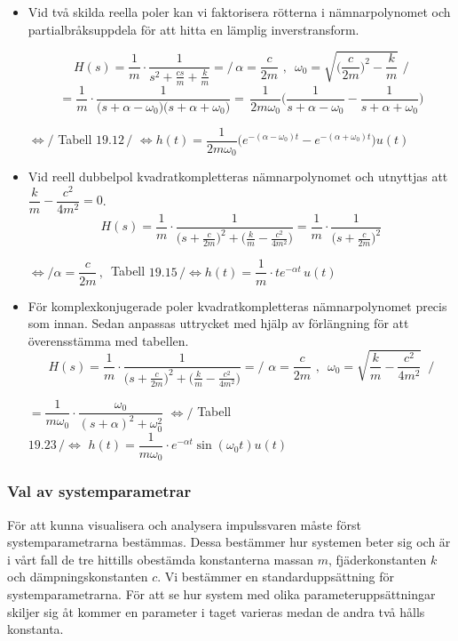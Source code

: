 \begin{itemize}
    \item Vid två skilda reella poler kan vi faktorisera rötterna i nämnarpolynomet och partialbråksuppdela för att hitta en lämplig inverstransform.
    
    $$H(s)=\frac{1}{m} \cdot \frac{1}{s^2+\frac{cs}{m}+\frac{k}{m}}=\Bigg/ \,\alpha=\frac{c}{2m}\,\,,\,\,\, \omega_0=\sqrt{\bigg(\frac{c}{2m}\bigg)^2-\frac{k}{m}} \,\,\Bigg/$$
    $$=\frac{1}{m} \cdot \frac{1}{\big(s+\alpha-\omega_0\big)\big(s+\alpha+\omega_0\big)}  = \, \frac{1}{2m\omega_0} \Bigg(\frac{1}{s+\alpha-\omega_0}-\frac{1}{s+\alpha+\omega_0}\Bigg)$$
    \begin{center}$ \Longleftrightarrow \bigg/$ Tabell $19.12\,\bigg/$ 
    $\Longleftrightarrow h(t)=\dfrac{1}{2m\omega_0}\bigg(e^{-(\alpha-\omega_0)t}-e^{-(\alpha+\omega_0)t}\bigg)u(t)$ \end{center}
    
    \item Vid reell dubbelpol kvadratkompletteras nämnarpolynomet och utnyttjas att
    $\dfrac{k}{m}-\dfrac{c^2}{4m^2}=0$.
    $$ H(s)= \frac{1}{m} \cdot\frac{1}{\big(s+\frac{c}{2m}\big)^2+\big(\frac{k}{m}-\frac{c^2}{4m^2}\big)} = \frac{1}{m} \cdot \frac{1}{\big(s+\frac{c}{2m}\big)^2}$$
    \begin{center}
    $ \Longleftrightarrow \bigg/ \alpha=\dfrac{c}{2m}\,,\,$ Tabell $19.15\,\bigg/ \Longleftrightarrow h(t)=\dfrac{1}{m} \cdot te^{-\alpha t}\,u(t)$
    \end{center}
    
    \item För komplexkonjugerade poler kvadratkompletteras nämnarpolynomet precis som innan. Sedan anpassas uttrycket med hjälp av förlängning för att överensstämma med tabellen.
    $$H(s)=\frac{1}{m} \cdot \frac{1}{\big(s+\frac{c}{2m}\big)^2+\big(\frac{k}{m}-\frac{c^2}{4m^2}\big)} = \Bigg/\, \,\alpha=\frac{c}{2m}\,\,,\,\,\,\omega_0=\sqrt{\frac{k}{m}-\frac{c^2}{4m^2}} \,\,\,\Bigg/ $$
    \begin{center}
    $=\dfrac{1}{m\omega_0} \cdot \dfrac{\omega_0}{(s+\alpha)^2+\omega_0^2} \,\,\Longleftrightarrow \bigg/$ Tabell $19.23\,\bigg/\Longleftrightarrow\,\, h(t)=\dfrac{1}{m\omega_0} \cdot e^{-\alpha t} \sin(\omega_0 t)u(t)$
    \end{center}
\end{itemize}

\subsubsection{Val av systemparametrar}
För att kunna visualisera och analysera impulssvaren måste först systemparametrarna bestämmas. Dessa bestämmer hur systemen beter sig och är i vårt fall de tre hittills obestämda konstanterna massan  $m$, fjäderkonstanten $k$ och dämpningskonstanten $c$. Vi bestämmer en standarduppsättning för systemparametrarna. För att se hur system med olika parameteruppsättningar skiljer sig åt kommer en parameter i taget varieras medan de andra två hålls konstanta.

